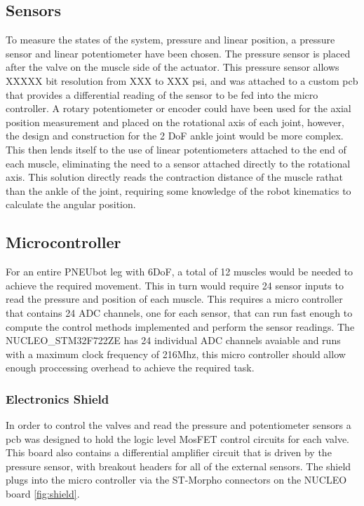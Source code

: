 \documentclass[11pt,a4paper]{article}
\begin{document}
\subsection{Sensors}
\label{sub:sensors}
To measure the states of the system, pressure and linear position, a pressure sensor and linear potentiometer have been chosen. The pressure sensor is placed after the valve on the muscle side of the actuator. This pressure sensor \cite{} allows XXXXX bit resolution from XXX to XXX psi, and was attached to a custom pcb that provides a differential reading of the sensor to be fed into the micro controller. A rotary potentiometer or encoder could have been used for the axial position measurement and placed on the rotational axis of each joint, however, the design and construction for the 2 DoF ankle joint would be more complex. This then lends itself to the use of linear potentiometers attached to the end of each muscle, eliminating the need to a sensor attached directly to the rotational axis. This solution directly reads the contraction distance of the muscle rathat than the ankle of the joint, requiring some knowledge of the robot kinematics to calculate the angular position.

\subsection{Microcontroller}
\label{sub:microcontroller}
For an entire PNEUbot leg with 6DoF, a total of 12 muscles would be needed to achieve the required movement. This in turn would require 24 sensor inputs to read the pressure and position of each muscle. This requires a micro controller that contains 24 ADC channels, one for each sensor, that can run fast enough to compute the control methods implemented and perform the sensor readings. The NUCLEO_STM32F722ZE \cite{stm32_nucleo_stm32f722ze} has 24 individual ADC channels avaiable and runs with a maximum clock frequency of 216Mhz, this micro controller should allow enough proccessing overhead to achieve the required task.

\subsubsection{Electronics Shield}
\label{sub:shield}
In order to control the valves and read the pressure and potentiometer sensors a pcb was designed to hold the logic level MosFET control circuits for each valve. This board also contains a differential amplifier circuit that is driven by the pressure sensor, with breakout headers for all of the external sensors. The shield plugs into the micro controller via the ST-Morpho connectors on the NUCLEO board \ref{fig:shield}.
\end{document}
